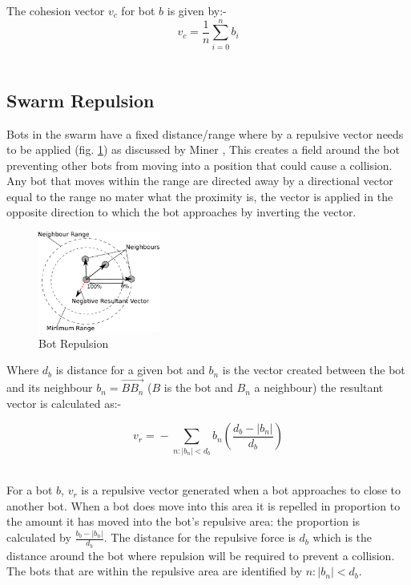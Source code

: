 \documentclass[10pt,journal,letterpaper,twoside]{IEEEtran}
\newcommand{\Fig}{fig.}
\begin{document}
The cohesion vector $v_{c}$ for bot $b$ is given by:-
\begin{equation}\label{eq:FlyToCentre1}
v_{c} = \frac{1}{n}{ \sum_{i=0}^{n}} b_i
\end{equation}‎

\subsection{Swarm Repulsion}
Bots in the swarm have a fixed distance/range where by a repulsive
vector needs to be applied (\Fig{} \ref{methods:Repulsion1}) as
discussed by Miner \cite{MD07}, This creates a field around the bot
preventing other bots from moving into a position that could cause a
collision. Any bot that moves within the range are directed away by a
directional vector equal to the range no mater what the proximity is,
the vector is applied in the opposite direction to which the bot
approaches by inverting the vector.

\begin{figure}[H]
\begin{center}
\includegraphics[width=4cm]{figures/Repulsion1}
\caption{Bot Repulsion \label{methods:Repulsion1}}
\end{center}
\end{figure}

Where $d_b$ is distance for a given bot and $b_n$ is the vector
created between the bot and its neighbour $b_n =‎
\overrightarrow{BB_n}$ ($B$ is the bot and $B_n$ a neighbour) the
resultant vector is calculated as:-

\begin{equation}
\label{eq:Repulsion1}
v_{r} =‎ - \sum_{n:|b_n| < d_b^{}} {b_n} \left ( \frac{d_b - |b_n|}{d_b} \right )
\end{equation}‎

For a bot $b$, $v_{r}$ is a repulsive vector generated when a bot
approaches to close to another bot. When a bot does move into this
area it is repelled in proportion to the amount it has moved into the
bot's repulsive area: the proportion is calculated by $\frac{b_{b} -
  |b_{n}|}{d_b}$. The distance for the repulsive force is $d_b$ which
is the distance around the bot where repulsion will be required to
prevent a collision. The bots that are within the repulsive area are
identified by ${n:|b_{n}| < d_b}$.
\end{document}
